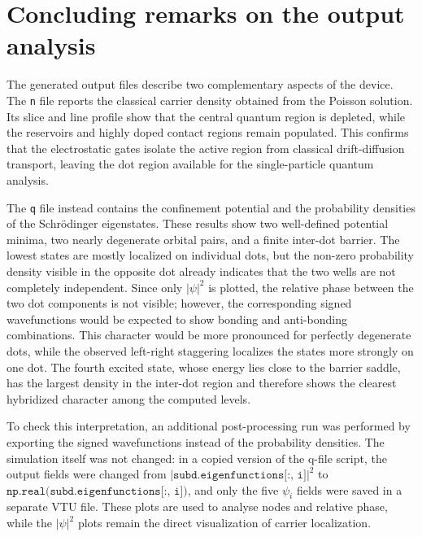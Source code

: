 \newpage
\section{Concluding remarks on the output analysis}

The generated output files describe two complementary aspects of the device.
The \texttt{n} file reports the classical carrier density obtained from the
Poisson solution. Its slice and line profile show that the central quantum
region is depleted, while the reservoirs and highly doped contact regions
remain populated. This confirms that the electrostatic gates isolate the
active region from classical drift-diffusion transport, leaving the dot region
available for the single-particle quantum analysis.

The \texttt{q} file instead contains the confinement potential and the
probability densities of the Schr\"odinger eigenstates. These results show two
well-defined potential minima, two nearly degenerate orbital pairs, and a
finite inter-dot barrier. The lowest states are mostly localized on individual
dots, but the non-zero probability density visible in the opposite dot already
indicates that the two wells are not completely independent. Since only
\(|\psi|^2\) is plotted, the relative phase between the two dot components is
not visible; however, the corresponding signed wavefunctions would be expected
to show bonding and anti-bonding combinations. This character would be more
pronounced for perfectly degenerate dots, while the observed left-right
staggering localizes the states more strongly on one dot. The fourth excited
state, whose energy lies close to the barrier saddle, has the largest density
in the inter-dot region and therefore shows the clearest hybridized character
among the computed levels.

To check this interpretation, an additional post-processing run was performed
by exporting the signed wavefunctions instead of the probability densities.
The simulation itself was not changed: in a copied version of the q-file
script, the output fields were changed from
\(\left|\texttt{subd.eigenfunctions[:, i]}\right|^2\) to
\(\texttt{np.real(subd.eigenfunctions[:, i])}\), and only the five
\(\psi_i\) fields were saved in a separate VTU file. These plots are used to
analyse nodes and relative phase, while the \(|\psi|^2\) plots remain the
direct visualization of carrier localization.

